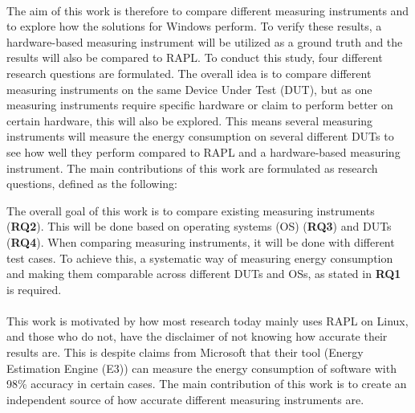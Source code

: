 \paragraph*{}
The aim of this work is therefore to compare different measuring instruments and to explore how the solutions for Windows perform. To verify these results, a hardware-based measuring instrument will be utilized as a ground truth and the results will also be compared to RAPL. To conduct this study, four different research questions are formulated. The overall idea is to compare different measuring instruments on the same Device Under Test (DUT), but as one measuring instruments require specific hardware or claim to perform better on certain hardware, this will also be explored. This means several measuring instruments will measure the energy consumption on several different DUTs to see how well they perform compared to RAPL and a hardware-based measuring instrument. The main contributions of this work are formulated as research questions, defined as the following:



The overall goal of this work is to compare existing measuring instruments (\textbf{RQ2}). This will be done based on operating systems (OS) (\textbf{RQ3}) and DUTs (\textbf{RQ4}). When comparing measuring instruments, it will be done with different test cases. To achieve this, a systematic way of measuring energy consumption and making them comparable across different DUTs and OSs, as stated in \textbf{RQ1} is required.

\paragraph*{}
This work is motivated by how most research today mainly uses RAPL on Linux\cite[]{Rasmussen2021,Pereira2017,Theilmann2022,Lindholt2022}, and those who do not, have the disclaimer of not knowing how accurate their results are\cite[]{Bruce2015ReducingEC, Ozturk2019, Unlu2021}. This is despite claims from Microsoft that their tool (Energy Estimation Engine (E3)) can measure the energy consumption of software with 98\% accuracy in certain cases\cite[]{E3WinHec}. The main contribution of this work is to create an independent source of how accurate different measuring instruments are.

